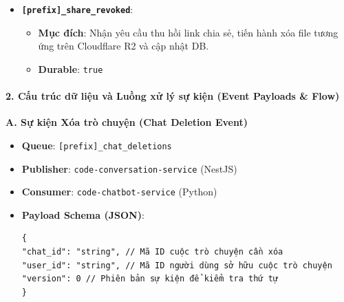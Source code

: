 \begin{itemize}
\item \textbf{\texttt{[prefix]\_share\_revoked}}:
\begin{itemize}
\item \textbf{Mục đích}: Nhận yêu cầu thu hồi link chia sẻ, tiến hành xóa file tương ứng trên Cloudflare R2 và cập nhật DB.
\item \textbf{Durable}: \texttt{true}
\end{itemize}
\end{itemize}

\paragraph{2. Cấu trúc dữ liệu và Luồng xử lý sự kiện (Event Payloads \& Flow)}

\textbf{A. Sự kiện Xóa trò chuyện (Chat Deletion Event)}
\begin{itemize}
\item \textbf{Queue}: \texttt{[prefix]\_chat\_deletions}
\item \textbf{Publisher}: \texttt{code-conversation-service} (NestJS)
\item \textbf{Consumer}: \texttt{code-chatbot-service} (Python)
\item \textbf{Payload Schema (JSON)}:
\begin{verbatim}
{
"chat_id": "string", // Mã ID cuộc trò chuyện cần xóa
"user_id": "string", // Mã ID người dùng sở hữu cuộc trò chuyện
"version": 0 // Phiên bản sự kiện để kiểm tra thứ tự
}
\end{verbatim}
\end{itemize}

